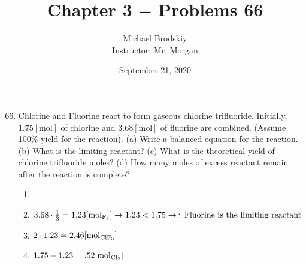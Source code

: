 \documentclass[12pt]{article}
\title{Chapter 3 $-$ Problems 66}
\date{September 21, 2020}
\author{Michael Brodskiy\\ \small Instructor: Mr. Morgan}
\begin{document}
\maketitle

\begin{enumerate}

    \setcounter{enumi}{65}

  \item Chlorine and Fluorine react to form gaseous chlorine trifluoride. Initially, $1.75[\si{\mole}]$ of chlorine and $3.68[\si{\mole}]$ of fluorine are combined. (Assume 100\% yield for the reaction). (a) Write a balanced equation for the reaction. (b) What is the limiting reactant? (c) What is the theoretical yield of chlorine trifluoride moles? (d) How many moles of excess reactant remain after the reaction is complete?

    \begin{enumerate}

      \item {}

      \item $3.68\cdot \frac{1}{3}=1.23[\si{\mole}_{\ce{F2}}]\rightarrow1.23 < 1.75\rightarrow \therefore \text{Fluorine is the limiting reactant}$

      \item $2\cdot1.23=2.46[\si{\mole}_{\ce{ClF3}}]$

      \item $1.75-1.23=.52[\si{\mole}_{\ce{Cl2}}]$

    \end{enumerate}

\end{enumerate}
\end{document}
